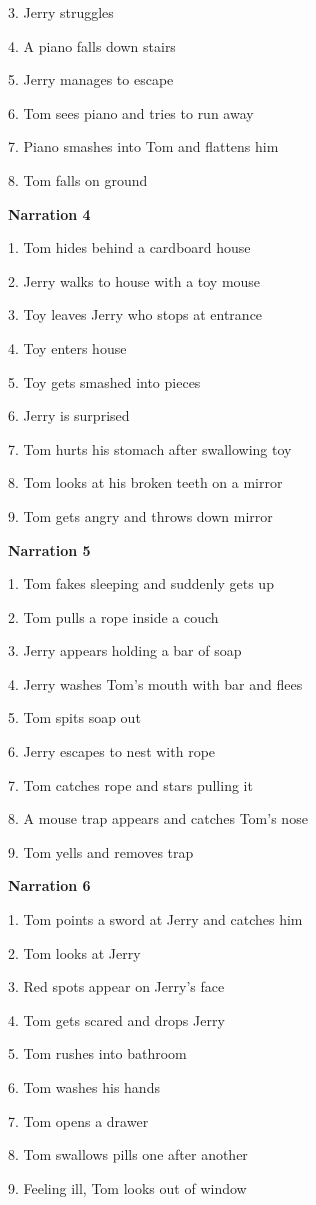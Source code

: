 \documentclass[review]{elsarticle} %
\begin{document}
3. Jerry struggles

4. A piano falls down stairs

5. Jerry manages to escape

6. Tom sees piano and tries to run away

7. Piano smashes into Tom and flattens him

8. Tom falls on ground

\textbf{Narration 4}

1. Tom hides behind a cardboard house

2. Jerry walks to house with a toy mouse

3. Toy leaves Jerry who stops at entrance

4. Toy enters house

5. Toy gets smashed into pieces

6. Jerry is surprised

7. Tom hurts his stomach after swallowing toy

8. Tom looks at his broken teeth on a mirror

9. Tom gets angry and throws down mirror

\textbf{Narration 5}

1. Tom fakes sleeping and suddenly gets up

2. Tom pulls a rope inside a couch

3. Jerry appears holding a bar of soap

4. Jerry washes Tom's mouth with bar and flees

5. Tom spits soap out

6. Jerry escapes to nest with rope

7. Tom catches rope and stars pulling it

8. A mouse trap appears and catches Tom's nose

9. Tom yells and removes trap

\textbf{Narration 6}

1. Tom points a sword at Jerry and catches him

2. Tom looks at Jerry

3. Red spots appear on Jerry's face

4. Tom gets scared and drops Jerry

5. Tom rushes into bathroom

6. Tom washes his hands

7. Tom opens a drawer

8. Tom swallows pills one after another

9. Feeling ill, Tom looks out of window
\end{document}
